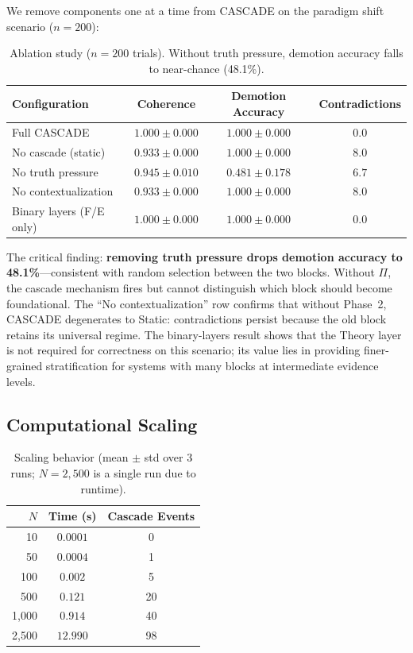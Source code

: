 \documentclass[11pt,a4paper]{article}
\theoremstyle{definition}
\newcommand{\tp}{\Pi}
\begin{document}
We remove components one at a time from CASCADE on the paradigm shift scenario ($n =
200$):

\begin{table}[H]
\centering
\caption{Ablation study ($n=200$ trials). Without truth pressure, demotion accuracy
falls to near-chance (48.1\%).}
\label{tab:ablation}
\begin{tabular}{@{}lccc@{}}
\toprule
\textbf{Configuration} & \textbf{Coherence} & \textbf{Demotion Accuracy} & \textbf{Contradictions} \\
\midrule
Full CASCADE              & $1.000 \pm 0.000$ & $1.000 \pm 0.000$ & $0.0$ \\
No cascade (static)       & $0.933 \pm 0.000$ & $1.000 \pm 0.000$ & $8.0$ \\
No truth pressure         & $0.945 \pm 0.010$ & $0.481 \pm 0.178$ & $6.7$ \\
No contextualization      & $0.933 \pm 0.000$ & $1.000 \pm 0.000$ & $8.0$ \\
Binary layers (F/E only)  & $1.000 \pm 0.000$ & $1.000 \pm 0.000$ & $0.0$ \\
\bottomrule
\end{tabular}
\end{table}

The critical finding: \textbf{removing truth pressure drops demotion accuracy to 48.1\%}---consistent
with random selection between the two blocks. Without $\tp$, the cascade mechanism fires
but cannot distinguish which block should become foundational. The ``No contextualization''
row confirms that without Phase~2, CASCADE degenerates to Static: contradictions persist
because the old block retains its universal regime. The binary-layers result shows that
the Theory layer is not required for correctness on this scenario; its value lies in
providing finer-grained stratification for systems with many blocks at intermediate
evidence levels.

\subsection{Computational Scaling}\label{sec:scaling}

\begin{table}[H]
\centering
\caption{Scaling behavior (mean $\pm$ std over 3 runs; $N=2{,}500$ is a single run due to runtime).}
\label{tab:scaling}
\begin{tabular}{@{}rcc@{}}
\toprule
$N$ & \textbf{Time (s)} & \textbf{Cascade Events} \\
\midrule
10      & $0.0001$ & 0  \\
50      & $0.0004$ & 1  \\
100     & $0.002$  & 5  \\
500     & $0.121$  & 20 \\
1{,}000 & $0.914$  & 40 \\
2{,}500 & $12.990$ & 98 \\
\bottomrule
\end{tabular}
\end{table}
\end{document}
